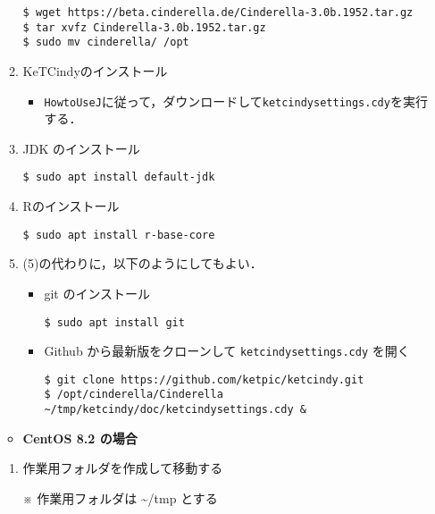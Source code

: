 \documentclass{ujarticle}
\begin{document}
\begin{enumerate}[\bf\large 1.]
\begin{enumerate}[(1)]
\begin{verbatim}
$ wget https://beta.cinderella.de/Cinderella-3.0b.1952.tar.gz
$ tar xvfz Cinderella-3.0b.1952.tar.gz
$ sudo mv cinderella/ /opt
\end{verbatim}

\item KeTCindyのインストール

\begin{itemize}
\item \verb|HowtoUseJ|に従って，ダウンロードして\verb|ketcindysettings.cdy|を実行する．
\end{itemize}

\item JDK のインストール

\verb|$ sudo apt install default-jdk|

\item Rのインストール

\verb|$ sudo apt install r-base-core|

\item (5)の代わりに，以下のようにしてもよい．

\begin{itemize}
\item git のインストール

\verb|$ sudo apt install git|

\item Github から最新版をクローンして \verb|ketcindysettings.cdy| を開く
\begin{verbatim}
$ git clone https://github.com/ketpic/ketcindy.git
$ /opt/cinderella/Cinderella ~/tmp/ketcindy/doc/ketcindysettings.cdy &
\end{verbatim}

\end{itemize}

\end{enumerate}

\vspace{\baselineskip}

\begin{itemize}
\item {\bf CentOS 8.2 の場合}
\end{itemize}

\begin{enumerate}[(1)]

\item 作業用フォルダを作成して移動する

※ 作業用フォルダは \textasciitilde/tmp とする


\end{enumerate}
\end{enumerate}
\end{document}
